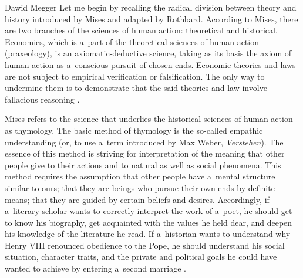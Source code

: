 \begin{artengenv}{Dawid Megger}
Let me begin by recalling the radical division between theory and history introduced by Mises and adapted by Rothbard. According to Mises, there are two branches of the sciences of human action: theoretical and historical. Economics, which is a~part of the theoretical sciences of human action (praxeology), is an axiomatic-deductive science, taking as its basis the axiom of human action as a~conscious pursuit of chosen ends. Economic theories and laws are not subject to empirical verification or falsification. The only way to undermine them is to demonstrate that the said theories and law involve fallacious reasoning 
\parencite[cf.][pp.30–41]{mises_human_1998}.%




Mises refers to the science that underlies the historical sciences of human action as thymology. The basic method of thymology is the so-called empathic understanding (or, to use a~term introduced by Max Weber, \textit{Verstehen}). The essence of this method is striving for interpretation of the meaning that other people give to their actions and to natural as well as social phenomena. This method requires the assumption that other people have a~mental structure similar to ours; that they are beings who pursue their own ends by definite means; that they are guided by certain beliefs and desires. Accordingly, if a~literary scholar wants to correctly interpret the work of a~poet, he should get to know his biography, get acquainted with the values he held dear, and deepen his knowledge of the literature he read. If a~historian wants to understand why Henry VIII renounced obedience to the Pope, he should understand his social situation, character traits, and the private and political goals he could have wanted to achieve by entering a~second marriage 
\parencite[][pp.264–284]{mises_theory_2007}.%





\end{artengenv}
